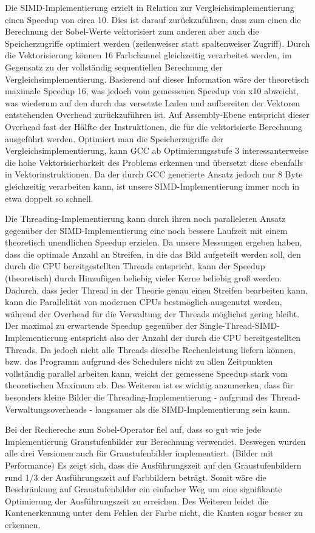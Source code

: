 \documentclass[course=erap]{aspdoc}
\begin{document}
Die SIMD-Implementierung erzielt in Relation zur Vergleichsimplementierung einen Speedup von circa 10.
Dies ist darauf zurückzuführen, dass zum einen die Berechnung der Sobel-Werte vektorisiert zum anderen aber auch die Speicherzugriffe optimiert werden (zeilenweiser statt spaltenweiser Zugriff).
Durch die Vektorisierung können 16 Farbchannel gleichzeitig verarbeitet werden, im Gegensatz zu der vollständig sequentiellen Berechnung der Vergleichsimplementierung.
Basierend auf dieser Information wäre der theoretisch maximale Speedup 16, was jedoch vom gemessenen Speedup von x10 abweicht, was wiederum auf den durch das versetzte Laden und aufbereiten der Vektoren entstehenden Overhead zurückzuführen ist.
Auf Assembly-Ebene entspricht dieser Overhead fast der Hälfte der Instruktionen, die für die vektorisierte Berechnung ausgeführt werden.
Optimiert man die Speicherzugriffe der Vergleichsimplementierung, kann GCC ab Optimierungsstufe 3 interessanterweise die hohe Vektorisierbarkeit des Problems erkennen und übersetzt diese ebenfalls in Vektorinstruktionen.
Da der durch GCC generierte Ansatz jedoch nur 8 Byte gleichzeitig verarbeiten kann, ist unsere SIMD-Implementierung immer noch in etwa doppelt so schnell.

Die Threading-Implementierung kann durch ihren noch paralleleren Ansatz gegenüber der SIMD-Implementierung eine noch bessere Laufzeit mit einem theoretisch unendlichen Speedup erzielen.
Da unsere Messungen ergeben haben, dass die optimale Anzahl an Streifen, in die das Bild aufgeteilt werden soll, den durch die CPU bereitgestellten Threads entspricht, kann der Speedup (theoretisch) durch Hinzufügen beliebig vieler Kerne beliebig groß werden.
Dadurch, dass jeder Thread in der Theorie genau einen Streifen bearbeiten kann, kann die Parallelität von modernen CPUs bestmöglich ausgenutzt werden, während der Overhead für die Verwaltung der Threads möglichst gering bleibt.
Der maximal zu erwartende Speedup gegenüber der Single-Thread-SIMD-Implementierung entspricht also der Anzahl der durch die CPU bereitgestellten Threads.
Da jedoch nicht alle Threads dieselbe Rechenleistung liefern können, bzw. das Programm aufgrund des Schedulers nicht zu allen Zeitpunkten vollständig parallel arbeiten kann, weicht der gemessene Speedup stark vom theoretischen Maximum ab.
Des Weiteren ist es wichtig anzumerken, dass für besonders kleine Bilder die Threading-Implementierung - aufgrund des Thread-Verwaltungsoverheads - langsamer als die SIMD-Implementierung sein kann.

Bei der Rechereche zum Sobel-Operator fiel auf, dass so gut wie jede Implementierung Graustufenbilder zur Berechnung verwendet.
Deswegen wurden alle drei Versionen auch für Graustufenbilder implementiert.
(Bilder mit Performance)
Es zeigt sich, dass die Ausführungszeit auf den Graustufenbildern rund 1/3 der Ausführungszeit auf Farbbildern beträgt.
Somit wäre die Beschränkung auf Graustufenbilder ein einfacher Weg um eine signifikante Optimierung der Ausführungszeit zu erreichen.
Des Weiteren leidet die Kantenerkennung unter dem Fehlen der Farbe nicht, die Kanten sogar besser zu erkennen.
\end{document}
